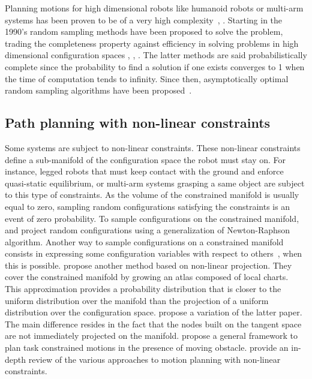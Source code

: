 Planning motions for high dimensional robots like humanoid robots or multi-arm
systems has been proven to be of a very high complexity~\cite{SchSha1983}, \cite{Canny1983}. Starting in the 1990's random sampling methods have been proposed
to solve the problem, trading the completeness property against efficiency in
solving problems in high dimensional configuration spaces \cite{KSLO1996}, \cite{HsuLatMot99}, \cite{KufLav00}. The latter methods are said probabilistically complete since the probability to find a solution if one exists converges to 1 when the time of computation tends to infinity. Since then, asymptotically optimal random sampling algorithms have
been proposed~\cite{KarFra2011}.

\subsection{Path planning with non-linear constraints}

Some systems are subject to non-linear constraints. These non-linear
constraints define a sub-manifold of the configuration space the robot must
stay on. For instance, legged robots that must keep contact with the
ground and enforce quasi-static equilibrium, or multi-arm systems
grasping a same object are subject to this type of constraints. As the
volume of the constrained manifold is usually equal to zero, sampling
random configurations satisfying the constraints is an event of zero
probability. To sample configurations on the constrained manifold,
\cite{DalNakLamLau2009} and \cite{berenson2011} project random
configurations using a generalization of Newton-Raphson
algorithm. Another way to sample configurations on a constrained
manifold consists in expressing some configuration variables with
respect to others~\cite{Cortes2002}, \cite{MirLam2018} when this is
possible. \cite{atlasRRT} propose another method based on non-linear
projection. They cover the constrained manifold by growing an atlas
composed of local charts. This approximation provides a probability
distribution that is closer to the uniform distribution over the
manifold than the projection of a uniform distribution over the
configuration space. \cite{tb-rrt2016} propose a variation of the latter paper.
The main difference resides in the fact that the nodes
built on the tangent space are not immediately projected on the manifold.
\cite{CefOri2019} propose a general framework to plan task constrained motions
in the presence of moving obstacle.
\cite{KinMolKav2019} provide an in-depth review of the various approaches to
motion planning with non-linear constraints.

